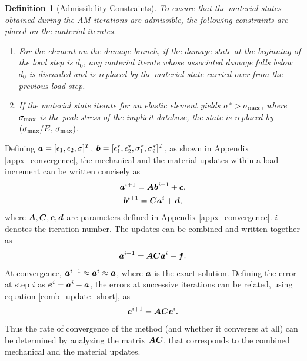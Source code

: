 \documentclass[10pt]{cas-sc}
\newtheorem{definition}{Definition}
\newenvironment{addedblock}
{\begingroup\color{blue!80}}
{\endgroup}
\begin{document}
\begin{addedblock}
	\begin{definition}[Admissibility Constraints]\label{def:branch_restrictions}
		To ensure that the material states obtained during the AM iterations are admissible, the following constraints are placed on the material iterates.
		\begin{enumerate}
			\item\label{br:irreversibility} For the element on the damage branch, if the damage state at the beginning of the load step is $d_0$, any material iterate whose associated damage falls below $d_0$ is discarded and is replaced by the material state carried over from the previous load step.
			\item\label{br:peak_cap} If the material state iterate for an elastic element yields $\sigma^* > \sigma_{\rm max}$, where $\sigma_{\rm max}$ is the peak stress of the implicit database, the state is replaced by $(\sigma_{\rm max}/E,\,\sigma_{\rm max})$.
		\end{enumerate}
	\end{definition}	
\end{addedblock}


Defining $\mbox{\boldmath $a$} = [\epsilon_1,\epsilon_2,\sigma]^T$, $\mbox{\boldmath $b$} = [\epsilon^*_1,\epsilon^*_2,\sigma^*_1,\sigma^*_2]^T$, as shown in Appendix \ref{appx_convergence}, the mechanical and the material updates within a load increment can be written concisely as 
\begin{gather}
	\mbox{\boldmath $a$}^{i+1} = \mbox{\boldmath $A$} \mbox{\boldmath $b$}^{i+1} + \mbox{\boldmath $c$}, \label{mech_update_short}\\
	\mbox{\boldmath $b$}^{i+1} = \mbox{\boldmath $C$} \mbox{\boldmath $a$}^{i} + \mbox{\boldmath $d$},  \label{mat_update_short}
\end{gather} 
where $\mbox{\boldmath $A$},\mbox{\boldmath $C$},\mbox{\boldmath $c$},\mbox{\boldmath $d$}$ are parameters defined in Appendix \ref{appx_convergence}. $i$ denotes the iteration number. The updates can be combined and written together as
\begin{equation}
	\mbox{\boldmath $a$}^{i+1} =  \mbox{\boldmath $A$}  \mbox{\boldmath $C$}	\mbox{\boldmath $a$}^{i} + \mbox{\boldmath $f$}.\label{comb_update_short}
\end{equation}
At convergence, $\mbox{\boldmath $a$}^{i+1} \approx \mbox{\boldmath $a$}^{i} \approx \mbox{\boldmath $a$}$, where $\mbox{\boldmath $a$}$ is the exact solution. Defining the error at step $i$ as $\mbox{\boldmath $e$}^i = \mbox{\boldmath $a$}^{i} - \mbox{\boldmath $a$}$, the errors at successive iterations can be related, using equation \ref{comb_update_short}, as
\begin{equation}
	\mbox{\boldmath $e$}^{i+1} =  \mbox{\boldmath $A$}  \mbox{\boldmath $C$}	\mbox{\boldmath $e$}^{i}.
\end{equation}
Thus the rate of convergence of the method (and whether it converges at all) can be determined by analyzing the matrix $\mbox{\boldmath $A$} \mbox{\boldmath $C$} $, that corresponds to the combined mechanical and the material updates. 
\end{document}
